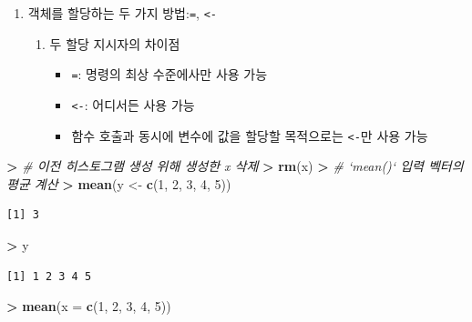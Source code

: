 \documentclass[12pt,a4paper]{book}
\newenvironment{Shaded}{\begin{snugshade}}{\end{snugshade}}
\newcommand{\KeywordTok}[1]{\textcolor[rgb]{0.13,0.29,0.53}{\textbf{#1}}}
\newcommand{\DataTypeTok}[1]{\textcolor[rgb]{0.13,0.29,0.53}{#1}}
\newcommand{\DecValTok}[1]{\textcolor[rgb]{0.00,0.00,0.81}{#1}}
\newcommand{\StringTok}[1]{\textcolor[rgb]{0.31,0.60,0.02}{#1}}
\newcommand{\CommentTok}[1]{\textcolor[rgb]{0.56,0.35,0.01}{\textit{#1}}}
\newcommand{\OperatorTok}[1]{\textcolor[rgb]{0.81,0.36,0.00}{\textbf{#1}}}
\newcommand{\ErrorTok}[1]{\textcolor[rgb]{0.64,0.00,0.00}{\textbf{#1}}}
\newcommand{\NormalTok}[1]{#1}
\providecommand{\tightlist}{%
  \setlength{\itemsep}{0pt}\setlength{\parskip}{0pt}}
\theoremstyle{definition}
\theoremstyle{definition}
\theoremstyle{definition}
\theoremstyle{remark}
\begin{document}
\begin{enumerate}
\def\labelenumi{\arabic{enumi}.}
\tightlist
\item
  객체를 할당하는 두 가지 방법:\texttt{=}, \texttt{\textless{}-}

  \begin{enumerate}
  \def\labelenumii{\arabic{enumii})}
  \tightlist
  \item
    두 할당 지시자의 차이점

    \begin{itemize}
    \tightlist
    \item
      \texttt{=}: 명령의 최상 수준에사만 사용 가능
    \item
      \texttt{\textless{}-}: 어디서든 사용 가능
    \item
      함수 호출과 동시에 변수에 값을 할당할 목적으로는
      \texttt{\textless{}-}만 사용 가능
    \end{itemize}
  \end{enumerate}
\end{enumerate}

\begin{Shaded}
\begin{Highlighting}[]
\OperatorTok{>}\StringTok{ }\CommentTok{# 이전 히스토그램 생성 위해 생성한 x 삭제}
\ErrorTok{>}\StringTok{ }\KeywordTok{rm}\NormalTok{(x)}
\OperatorTok{>}\StringTok{ }\CommentTok{# `mean()` 입력 벡터의 평균 계산}
\ErrorTok{>}\StringTok{ }\KeywordTok{mean}\NormalTok{(y <-}\StringTok{ }\KeywordTok{c}\NormalTok{(}\DecValTok{1}\NormalTok{, }\DecValTok{2}\NormalTok{, }\DecValTok{3}\NormalTok{, }\DecValTok{4}\NormalTok{, }\DecValTok{5}\NormalTok{))}
\end{Highlighting}
\end{Shaded}

\begin{verbatim}
[1] 3
\end{verbatim}

\begin{Shaded}
\begin{Highlighting}[]
\OperatorTok{>}\StringTok{ }\NormalTok{y}
\end{Highlighting}
\end{Shaded}

\begin{verbatim}
[1] 1 2 3 4 5
\end{verbatim}

\begin{Shaded}
\begin{Highlighting}[]
\OperatorTok{>}\StringTok{ }\KeywordTok{mean}\NormalTok{(}\DataTypeTok{x =} \KeywordTok{c}\NormalTok{(}\DecValTok{1}\NormalTok{, }\DecValTok{2}\NormalTok{, }\DecValTok{3}\NormalTok{, }\DecValTok{4}\NormalTok{, }\DecValTok{5}\NormalTok{))}
\end{Highlighting}
\end{Shaded}
\end{document}
